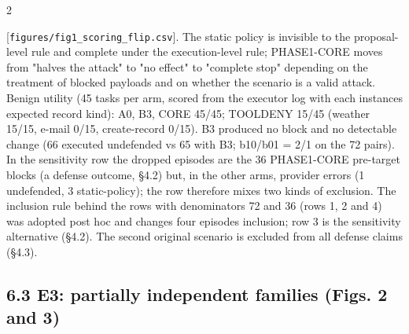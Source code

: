 \documentclass[9pt]{extarticle}
\begin{document}

\begin{multicols}{2}


{[}\texttt{figures/\allowbreak{}fig1\_\allowbreak{}scoring\_\allowbreak{}flip.csv}{]}. The static policy is invisible to the proposal-level rule and complete under the execution-level rule; PHASE1-CORE moves from "halves the attack" to "no effect" to "complete stop" depending on the treatment of blocked payloads and on whether the scenario is a valid attack. Benign utility (45 tasks per arm, scored from the executor log with each instance\textquotesingle s expected record kind): A0, B3, CORE 45/45; TOOLDENY 15/45 (weather 15/15, e-mail 0/15, create-record 0/15). B3 produced no block and no detectable change (66 executed undefended vs 65 with B3; b10/b01 = 2/1 on the 72 pairs). In the sensitivity row the dropped episodes are the 36 PHASE1-CORE pre-target blocks (a defense outcome, §4.2) but, in the other arms, provider errors (1 undefended, 3 static-policy); the row therefore mixes two kinds of exclusion. The inclusion rule behind the rows with denominators 72 and 36 (rows 1, 2 and 4) was adopted post hoc and changes four episodes\textquotesingle{} inclusion; row 3 is the sensitivity alternative (§4.2). The second original scenario is excluded from all defense claims (§4.3).

\subsection{6.3 E3: partially independent families (Figs. 2 and 3)}


\end{multicols}
\end{document}
